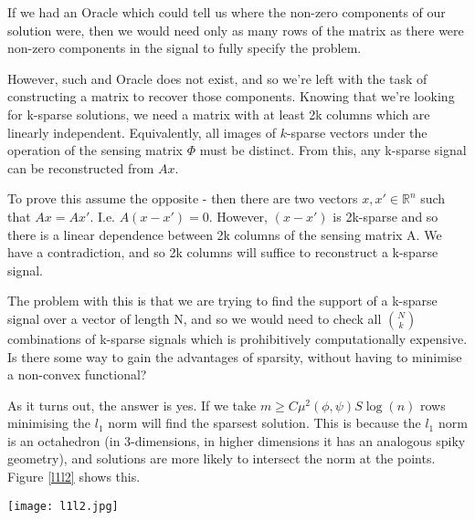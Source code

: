 If we had an Oracle which could tell us where the non-zero components of our solution were, then we would need only as many rows of the matrix as there were non-zero components in the signal to fully specify the problem. 


However, such and Oracle does not exist, and so we're left with the task of constructing a matrix to recover those components. Knowing that we're looking for k-sparse solutions, we need a matrix with at least 2k columns which are linearly independent. Equivalently, all images of \(k\)-sparse vectors under the operation of the sensing matrix \(\Phi\) must be distinct. From this, any k-sparse signal can be reconstructed from \(Ax\). 

To prove this assume the opposite - then there are two vectors \(x, x' \in \mathbb{R}^n\) such that \(Ax = Ax'\). I.e. \(A(x-x') = 0\). However, \((x-x')\) is 2k-sparse and so there is a linear dependence between 2k columns of the sensing matrix A. We have a contradiction, and so 2k columns will suffice to reconstruct a k-sparse signal. 

The problem with this is that we are trying to find the support of a k-sparse signal over a vector of length N, and so we would need to check all \(N \choose k\) combinations of k-sparse signals which is prohibitively computationally expensive. Is there some way to gain the advantages of sparsity, without having to minimise a non-convex functional?

As it turns out, the answer is yes. If we take \( m \geq C \mu^2(\phi, \psi) S \log\left(n\right) \) rows minimising the \(l_{1}\) norm will find the sparsest solution. This is because the \(l_1\) norm is an octahedron (in 3-dimensions, in higher dimensions it has an analogous spiky geometry), and solutions are more likely to intersect the norm at the points. Figure \ref{l1l2} shows this.

\begin{figure*}[h]
\centering
\texttt{[image: l1l2.jpg]}
\caption{Solutions to the Compressive Sensing optimisation problem intersect the \(l_1\) norm the points where all components (but one) of the vector are zero (i.e. it is sparsity promoting) \cite{Tibshirani1996}}
\label{l1l2}
\end{figure*}

